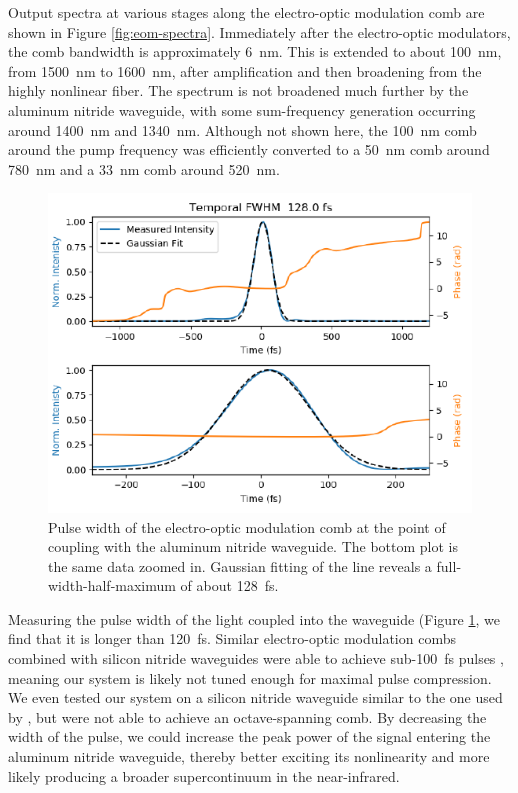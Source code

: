 Output spectra at various stages along the electro-optic modulation comb are shown in Figure \ref{fig:eom-spectra}. Immediately after the electro-optic modulators, the comb bandwidth is approximately 6~\si{\nano\meter}. This is extended to about 100~\si{\nano\meter}, from 1500~\si{\nano\meter} to 1600~\si{\nano\meter}, after amplification and then broadening from the highly nonlinear fiber. The spectrum is not broadened much further by the aluminum nitride waveguide, with some sum-frequency generation occurring around 1400~\si{\nano\meter} and 1340~\si{\nano\meter}. Although not shown here, the 100~\si{\nano\meter} comb around the pump frequency was efficiently converted to a 50~\si{\nano\meter} comb around 780~\si{\nano\meter} and a 33~\si{\nano\meter} comb around 520~\si{\nano\meter}.

\begin{figure}
    \centering
    \includegraphics[width=\textwidth]{figures-3/eom-pulse.pdf}
    \caption[Electro-optic modulation comb pulse width]{Pulse width of the electro-optic modulation comb at the point of coupling with the aluminum nitride waveguide. The bottom plot is the same data zoomed in. Gaussian fitting of the line reveals a full-width-half-maximum of about 128~\si{\femto\second}.}
    \label{fig:eom-pulse}
\end{figure}

Measuring the pulse width of the light coupled into the waveguide (Figure \ref{fig:eom-pulse}, we find that it is longer than 120~\si{\femto\second}. Similar electro-optic modulation combs combined with silicon nitride waveguides were able to achieve sub-100~\si{\femto\second} pulses \citep{carlson_ultrafast_2017, obrzud_visible_2019}, meaning our system is likely not tuned enough for maximal pulse compression. We even tested our system on a silicon nitride waveguide similar to the one used by \citet{carlson_ultrafast_2017}, but were not able to achieve an octave-spanning comb. By decreasing the width of the pulse, we could increase the peak power of the signal entering the aluminum nitride waveguide, thereby better exciting its nonlinearity and more likely producing a broader supercontinuum in the near-infrared.

